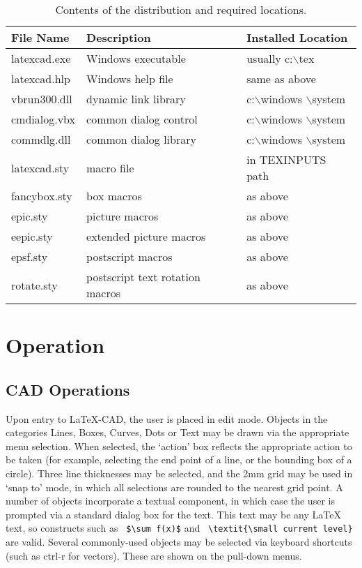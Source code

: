\documentclass[a4paper]{article}
\newcommand{\bs}{$\backslash$}
\begin{document}
\begin{table}
	\begin{tabular}{lll}
		\hline\hline
		File Name & Description & Installed Location \\
		\hline
		latexcad.exe & Windows executable & usually c:\bs tex \\
		latexcad.hlp & Windows help file  & same as above  \\
		vbrun300.dll & dynamic link library    & c:\bs windows \bs system \\
		cmdialog.vbx & common dialog control   & c:\bs windows \bs system \\
		commdlg.dll  & common dialog library   & c:\bs windows \bs system \\
		latexcad.sty & macro file         & in TEXINPUTS path \\
		fancybox.sty & box macros         & as above \\
		epic.sty     & picture macros     & as above \\
		eepic.sty    & extended picture macros & as above \\
		epsf.sty     & postscript macros  & as above \\
		rotate.sty   & postscript text rotation macros  & as above \\
		\hline
	\end{tabular}
	\caption{Contents of the distribution and required locations.}
	\label{tab:files}
\end{table}

\section{ Operation }

\subsection{ CAD Operations }
Upon entry to LaTeX-CAD, the user is placed in edit mode. Objects in
the categories  Lines, Boxes, Curves, Dots or Text may be drawn via
the appropriate menu selection. When selected, the `action' box
reflects the appropriate action to be taken (for example, selecting
the end point of a line, or the bounding box of a circle). Three
line thicknesses may be selected, and the 2mm grid may be used in
`snap to' mode, in which all selections are rounded to the nearest
grid point. A number of objects incorporate a textual component, in
which case the user is prompted via a standard dialog box for the
text. This text may be any \LaTeX\/ text, so constructs such as
\verb! $\sum f(x)$! and \verb! \textit{\small current level}!
are valid. Several commonly-used objects may be selected via
keyboard shortcuts (such as ctrl-r for vectors). These are shown
on the pull-down menus.
\end{document}
